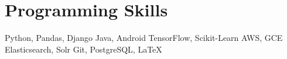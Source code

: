 \documentclass[a4paper,10pt]{article}
\newcommand{\resumeSubHeadingListStart}{\begin{itemize}[leftmargin=*]\setlength\itemsep{0pt}\setlength{\parskip}{-1pt}\setlength{\parsep}{0pt}}
\newcommand{\resumeSubHeadingListEnd}{\end{itemize}}
\begin{document}
\section{Programming Skills}
  \resumeSubHeadingListStart
    \small{\item{
      {Python, Pandas, Django}
      \hfill{Java, Android}
      \hfill{TensorFlow, Scikit-Learn}
      \hfill{AWS, GCE}
      \hfill{Elasticsearch, Solr}
      \hfill{Git, PostgreSQL, \LaTeX}
      
    }}
  \resumeSubHeadingListEnd

\end{document}

